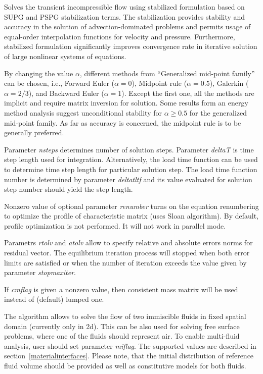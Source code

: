 \documentclass[a4paper]{article}
\newcommand{\param}[1]{{\em #1}}
\begin{document}
Solves the transient incompressible flow using stabilized formulation
based on SUPG and PSPG
stabilization terms. The stabilization provides
stability and accuracy in the solution of
advection-dominated problems and permits usage of equal-order
interpolation functions for velocity and pressure. Furthermore,
stabilized formulation significantly improves convergence rate in
iterative solution of large nonlinear systems of equations.

By changing the value $\alpha$, different methods from
``Generalized mid-point family'' can be chosen, i.e., 
Forward Euler ($\alpha=0$), Midpoint rule ($\alpha=0.5$),
 Galerkin ($\alpha=2/3$), and  Backward Euler ($\alpha=1$). Except
the first one, all the methods are implicit and require matrix inversion for solution. 
Some results form an energy method analysis suggest unconditional
stability for $\alpha\ge 0.5$ for the generalized mid-point family. As
far as accuracy is concerned, the midpoint rule is to be generally preferred. 

Parameter \param{nsteps} determines number of solution
steps. Parameter \param{deltaT} is time step length used for
integration. Alternatively, the load time function can be used to
determine time step length for particular solution step. The load time
function number is determined by parameter \param{deltatltf} and its
value evaluated for solution step number should yield the step length.

Nonzero value of optional parameter \param{renumber} turns on the
equation renumbering to optimize the profile of characteristic matrix
(uses Sloan algorithm). By default, profile optimization is not
performed. It will not work in parallel mode.

Parametrs \param{rtolv} and \param{atolv} allow to
specify relative and absolute errors norms for residual vector.
The equilibrium iteration process will stopped when both error limits
are satisfied or when the number of iteration exceeds the value given
by parameter \param{stopmaxiter}.

If \param{cmflag} is given a nonzero value, then
consistent mass matrix will be used instead of (default) lumped one.

The algorithm allows to solve the flow of two immiscible fluids in
fixed spatial domain (currently only in 2d). This can be also used for
solving free surface problems, where one of the fluids should
represent air. To enable multi-fluid analysis, user should set parameter \param{miflag}. The supported values are described in section~\ref{materialinterfaces}. 
Please note, that the initial distribution of reference fluid
volume should be provided as well as 
constitutive models for both fluids.
\end{document}

